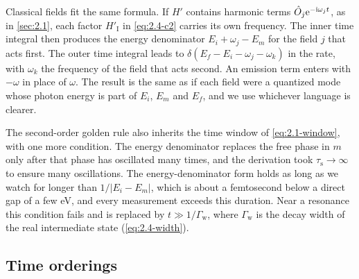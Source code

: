 Classical fields fit the same formula. If $H'$ contains harmonic terms $\hat{O}_j\mathrm{e}^{-\mathrm{i}\omega_jt}$, as in \cref{sec:2.1}, each factor $H'_{\mathrm{I}}$ in \cref{eq:2.4-c2} carries its own frequency. The inner time integral then produces the energy denominator $E_i + \omega_j - E_m$ for the field $j$ that acts first. The outer time integral leads to $\delta(E_f - E_i - \omega_j - \omega_k)$ in the rate, with $\omega_k$ the frequency of the field that acts second. An emission term enters with $-\omega$ in place of $\omega$. The result is the same as if each field were a quantized mode whose photon energy is part of $E_i$, $E_m$ and $E_f$, and we use whichever language is clearer.

The second-order golden rule also inherits the time window of \cref{eq:2.1-window}, with one more condition. The energy denominator replaces the free phase in $m$ only after that phase has oscillated many times, and the derivation took $\tau_{\mathrm{s}} \to \infty$ to ensure many oscillations. The energy-denominator form holds as long as we watch for longer than $1/|E_i - E_m|$, which is about a femtosecond below a direct gap of a few eV, and every measurement exceeds this duration. Near a resonance this condition fails and is replaced by $t \gg 1/\varGamma_{\mathrm{w}}$, where $\varGamma_{\mathrm{w}}$ is the decay width of the real intermediate state (\cref{eq:2.4-width}).

\subsection{Time orderings}

